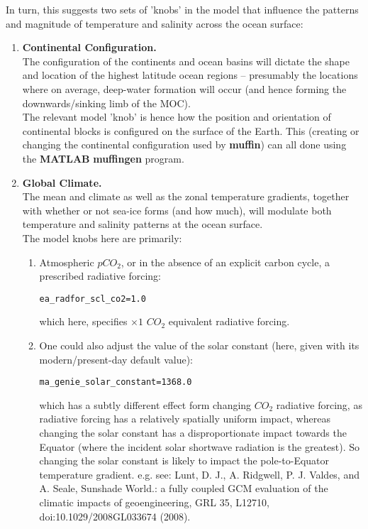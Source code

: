 \documentclass[11pt,fleqn]{book} %
\begin{document}
In turn, this suggests two sets of 'knobs' in the model that influence the patterns and magnitude of temperature and salinity across the ocean surface:

\vspace{1mm}
\begin{enumerate}
\vspace{1mm}
\item \textbf{Continental Configuration.}
\\The configuration of the continents and ocean basins will dictate the shape and location of the highest latitude ocean regions -- presumably the locations where on average, deep-water formation will occur (and hence forming the downwards/sinking limb of the MOC).
\\The relevant model 'knob' is hence how the position and orientation of continental blocks is configured on the surface of the Earth. This (creating or changing the continental configuration used by \textbf{muffin}) can all done using the \textbf{MATLAB} \textbf{muffingen} program.
\vspace{1mm}
\item \textbf{Global Climate.}
\\The mean and climate as well as the zonal temperature gradients, together with whether or not sea-ice forms (and how much), will modulate both temperature and salinity patterns at the ocean surface.
\\The model knobs here are primarily:
\begin{enumerate}
\item Atmospheric \(pCO_{2}\), or in the absence of an explicit carbon cycle, a prescribed radiative forcing:
\vspace{-2pt}\begin{verbatim}
ea_radfor_scl_co2=1.0
\end{verbatim}\vspace{-2pt}
which here, specifies \(\times1\) \(CO_{2}\) equivalent radiative forcing.
\item One could also adjust the value of the solar constant (here, given with its modern/present-day default value):
\vspace{-2pt}\begin{verbatim}
ma_genie_solar_constant=1368.0
\end{verbatim}\vspace{-2pt}
which has a subtly different effect form changing \(CO_{2}\) radiative forcing, as radiative forcing has a relatively spatially uniform impact, whereas changing the solar constant has a disproportionate impact towards the Equator (where the incident solar shortwave radiation is the greatest). So changing the solar constant is likely to impact the pole-to-Equator temperature gradient. e.g. see: Lunt, D. J., A. Ridgwell, P. J. Valdes, and A. Seale, Sunshade World.: a fully coupled GCM evaluation of the climatic impacts of geoengineering, GRL 35, L12710, doi:10.1029/2008GL033674 (2008).

\end{enumerate}
\end{enumerate}
\end{document}
